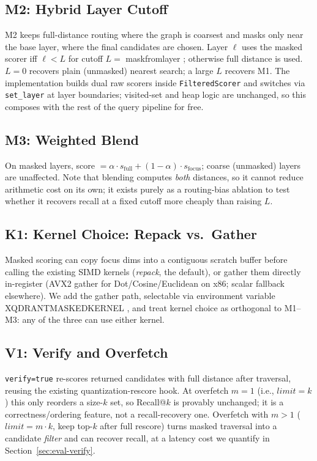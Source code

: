 \documentclass[sigconf,review,balance=false]{acmart}
\newcommand{\breakablecode}[1]{%
  {\ttfamily
    \renewcommand{\_}{\textunderscore\allowbreak}%
    #1%
  }}
\begin{document}
\subsection{M2: Hybrid Layer Cutoff}

M2 keeps full-distance routing where the graph is coarsest and masks only near
the base layer, where the final candidates are chosen. Layer $\ell$ uses the
masked scorer iff $\ell < L$ for cutoff
$L ={}$\breakablecode{mask\_from\_layer}; otherwise full distance is used.
$L{=}0$ recovers plain (unmasked) nearest search; a large $L$ recovers M1.
The implementation builds dual raw scorers inside \texttt{FilteredScorer}
and switches via \texttt{set\_layer} at layer boundaries; visited-set and
heap logic are unchanged, so this composes with the rest of the query
pipeline for free.

\subsection{M3: Weighted Blend}

On masked layers, score $= \alpha \cdot s_{\mathrm{full}} + (1-\alpha)\cdot
s_{\mathrm{focus}}$; coarse (unmasked) layers are unaffected. Note that
blending computes \emph{both} distances, so it cannot reduce arithmetic cost on
its own; it exists purely as a routing-bias ablation to test whether it
recovers recall at a fixed cutoff more cheaply than raising $L$.

\subsection{K1: Kernel Choice: Repack vs.\ Gather}

Masked scoring can copy focus dims into a contiguous scratch buffer before
calling the existing SIMD kernels (\emph{repack}, the default), or gather
them directly in-register (AVX2 gather for Dot/Cosine/Euclidean on x86;
scalar fallback elsewhere). We add the gather path, selectable via
environment variable \breakablecode{XQDRANT\_MASKED\_KERNEL}, and treat kernel
choice as orthogonal to M1--M3: any of the three can use either kernel.

\subsection{V1: Verify and Overfetch}

\texttt{verify=true} re-scores returned candidates with full distance after
traversal, reusing the existing quantization-rescore hook. At overfetch
$m{=}1$ (i.e., $\mathit{limit}=k$) this only reorders a size-$k$ set, so
Recall@$k$ is provably unchanged; it is a correctness/ordering feature, not a
recall-recovery one. Overfetch with $m>1$ ($\mathit{limit}=m\cdot k$, keep
top-$k$ after full rescore) turns masked traversal into a candidate
\emph{filter} and can recover recall, at a latency cost we quantify in
Section~\ref{sec:eval-verify}.
\end{document}
